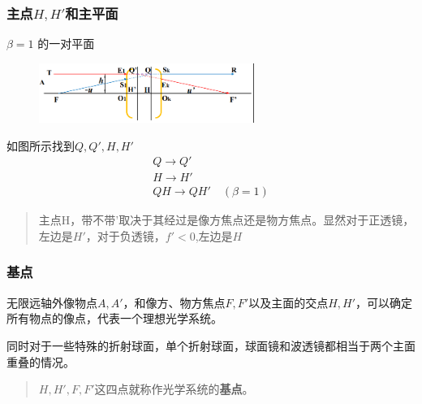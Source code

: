     \subsubsection{主点$H,H'$和主平面}
    \begin{definition}[主平面]
    $\beta=1$ 的一对平面
    \end{definition}
    \begin{figure}[H]
        \centering
        \includegraphics[width=7cm]{img/3.1.png}
        \end{figure} 
如图所示找到$Q,Q',H,H'$
\begin{align}
    Q \to Q' \tag{3.2.3.a}\\
    H \to H' \tag{3.2.3.b}\\
    QH \to QH' \quad (\beta=1) \tag{3.2.3.c}\end{align}
\begin{quote}
{\ccwd\kaishu{}
主点H，带不带'取决于其经过是像方焦点还是物方焦点。显然对于正透镜，左边是$H'$，对于负透镜，$f'< 0$,左边是$H$

}
\end{quote}
\subsubsection{基点}
无限远轴外像物点$A,A'$，和像方、物方焦点$F,F'$以及主面的交点$H,H'$，可以确定所有物点的像点，代表一个理想光学系统。

同时对于一些特殊的折射球面，单个折射球面，球面镜和波透镜都相当于两个主面重叠的情况。
\begin{quote}
{\ccwd\kaishu{}
$H,H',F,F'$这四点就称作光学系统的\textbf{基点}。
}
\end{quote}
